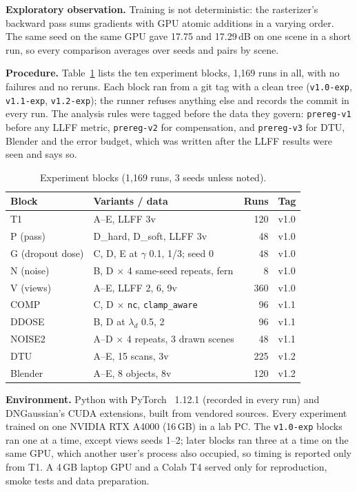 \documentclass[conference]{IEEEtran}
\newcommand{\dB}{\,dB}
\begin{document}
\textbf{Exploratory observation.} Training is not deterministic: the rasterizer's backward pass sums gradients with GPU atomic additions in a varying order. The same seed on the same GPU gave 17.75 and 17.29\dB{} on one scene in a short run, so every comparison averages over seeds and pairs by scene.

\textbf{Procedure.} Table~\ref{tab:blocks} lists the ten experiment blocks, 1,169 runs in all, with no failures and no reruns. Each block ran from a git tag with a clean tree (\texttt{v1.0-exp}, \texttt{v1.1-exp}, \texttt{v1.2-exp}); the runner refuses anything else and records the commit in every run. The analysis rules were tagged before the data they govern: \texttt{prereg-v1} before any LLFF metric, \texttt{prereg-v2} for compensation, and \texttt{prereg-v3} for DTU, Blender and the error budget, which was written after the LLFF results were seen and says so.

\begin{table}[t]
\caption{Experiment blocks (1,169 runs, 3 seeds unless noted).}\label{tab:blocks}
\centering\footnotesize\setlength{\tabcolsep}{2.5pt}
\begin{tabular}{@{}llrl@{}}
\toprule
Block & Variants / data & Runs & Tag \\
\midrule
T1 & A--E, LLFF 3v & 120 & v1.0 \\
P (pass) & D\_hard, D\_soft, LLFF 3v & 48 & v1.0 \\
G (dropout dose) & C, D, E at $\gamma$ 0.1, 1/3; seed 0 & 48 & v1.0 \\
N (noise) & B, D $\times$ 4 same-seed repeats, fern & 8 & v1.0 \\
V (views) & A--E, LLFF 2, 6, 9v & 360 & v1.0 \\
COMP & C, D $\times$ \texttt{nc}, \texttt{clamp\_aware} & 96 & v1.1 \\
DDOSE & B, D at $\lambda_d$ 0.5, 2 & 96 & v1.1 \\
NOISE2 & A--D $\times$ 4 repeats, 3 drawn scenes & 48 & v1.1 \\
DTU & A--E, 15 scans, 3v & 225 & v1.2 \\
Blender & A--E, 8 objects, 8v & 120 & v1.2 \\
\bottomrule
\end{tabular}
\end{table}

\textbf{Environment.} Python with PyTorch~\cite{paszke2019pytorch} 1.12.1 (recorded in every run) and DNGaussian's CUDA extensions, built from vendored sources. Every experiment trained on one NVIDIA RTX A4000 (16\,GB) in a lab PC. The \texttt{v1.0-exp} blocks ran one at a time, except views seeds 1--2; later blocks ran three at a time on the same GPU, which another user's process also occupied, so timing is reported only from T1. A 4\,GB laptop GPU and a Colab T4 served only for reproduction, smoke tests and data preparation.
\end{document}
